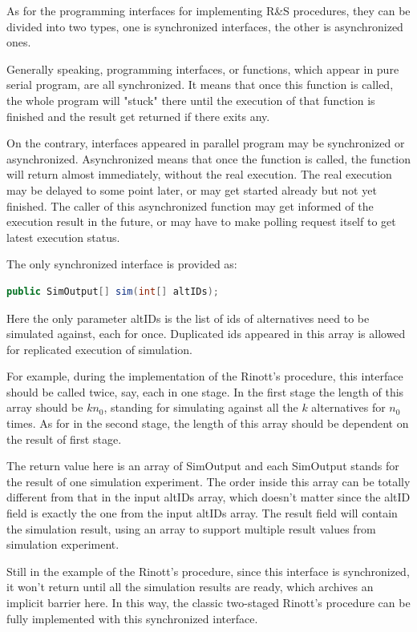 \documentclass[12pt,a4paper]{report}
\begin{document}
As for the programming interfaces for implementing R\&S procedures, they can be divided into two types, one is synchronized interfaces, the other is asynchronized ones.

Generally speaking, programming interfaces, or functions, which appear in pure serial program, are all synchronized. It means that once this function is called, the whole program will "stuck" there until the execution of that function is finished and the result get returned if there exits any.

On the contrary, interfaces appeared in parallel program may be synchronized or asynchronized. Asynchronized means that once the function is called, the function will return almost immediately, without the real execution. The real execution may be delayed to some point later, or may get started already but not yet finished. The caller of this asynchronized function may get informed of the execution result in the future, or may have to make polling request itself to get latest execution status.

The only synchronized interface is provided as:

\begin{lstlisting}[language=Java]
public SimOutput[] sim(int[] altIDs);
\end{lstlisting}

Here the only parameter altIDs is the list of ids of alternatives need to be simulated against, each for once. Duplicated ids appeared in this array is allowed for replicated execution of simulation.

For example, during the implementation of the Rinott's procedure, this interface should be called twice, say, each in one stage. In the first stage the length of this array should be $kn_0$, standing for simulating against all the $k$ alternatives for $n_0$ times. As for in the second stage, the length of this array should be dependent on the result of first stage.

The return value here is an array of SimOutput and each SimOutput stands for the result of one simulation experiment. The order inside this array can be totally different from that in the input altIDs array, which doesn't matter since the altID field is exactly the one from the input altIDs array. The result field will contain the simulation result, using an array to support multiple result values from simulation experiment.

Still in the example of the Rinott's procedure, since this interface is synchronized, it won't return until all the simulation results are ready, which archives an implicit barrier here. In this way, the classic two-staged Rinott's procedure can be fully implemented with this synchronized interface.
\end{document}
